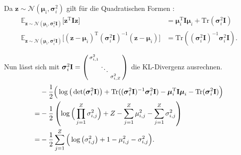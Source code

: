 \documentclass[12pt]{article}
\newcommand{\z}{\mathbf{z}}
\begin{document}
	Da $\z\sim\mathcal{N}(\boldsymbol\mu_{i},\boldsymbol\sigma_{i}^{2})$ gilt für die Quadratischen Formen \cite{matrix}:
	\begin{align*}
	\mathbb{E}_{\z\sim\mathcal{N}(\boldsymbol\mu_{i},\boldsymbol\sigma_{i}^{2}\mathbf{I})}\big[\textbf{z}^{\mathrm{T}}\mathbf{I}\textbf{z}\big] &= \boldsymbol\mu_{i}^{\mathrm{T}}\mathbf{I}\boldsymbol\mu_{i}+\mathrm{Tr}(\boldsymbol\sigma_{i}^{2}\mathbf{I})\\ \mathbb{E}_{\z\sim\mathcal{N}(\boldsymbol\mu_{i},\boldsymbol\sigma_{i}^{2}\mathbf{I})}\big[(\textbf{z}-\boldsymbol\mu_{i})^{\mathrm{T}}(\boldsymbol\sigma_{i}^{2}\mathbf{I})^{-1}(\textbf{z}-\boldsymbol\mu_{i})\big] &= \mathrm{Tr}((\boldsymbol\sigma_{i}^{2}\mathbf{I})^{-1}\boldsymbol\sigma_{i}^{2}\mathbf{I}).
	\end{align*}


	Nun lässt sich mit ${\boldsymbol\sigma_{i}^{2}\mathbf{I}} =  \begin{psmallmatrix}\sigma_{i,1}^{2} & \ &\ \\ \ & \ddots &\ \\ \ & \ &\sigma_{i,Z}^{2}\end{psmallmatrix}$ die KL-Divergenz ausrechnen.
	\begin{align*}
	&-\frac{1}{2}\Big(\log\big(\det(\boldsymbol\sigma_{i}^{2}\mathbf{I})\big)+\mathrm{Tr}((\boldsymbol\sigma_{i}^{2}\mathbf{I})^{-1}\boldsymbol\sigma_{i}^{2}\mathbf{I})-\boldsymbol\mu_{i}^{\mathrm{T}}\textbf{I}\boldsymbol\mu_{i}-\mathrm{Tr}(\boldsymbol\sigma_{i}^{2}\mathbf{I})\Big) \notag \\
	= &-\frac{1}{2}\left(\log\Big(\prod_{j=1}^{Z}\sigma_{i,j}^{2}\Big)+Z-\sum_{j=1}^{Z}\mu_{i,j}^{2}-\sum_{j=1}^{Z}\sigma_{i,j}^{2}\right) \notag \\
	= &-\frac{1}{2}\sum_{j=1}^{Z}\Big(\log\big(\sigma_{i,j}^{2}\big)+1-\mu_{i,j}^{2}-\sigma_{i,j}^{2}\Big).
	\end{align*}
\end{document}
